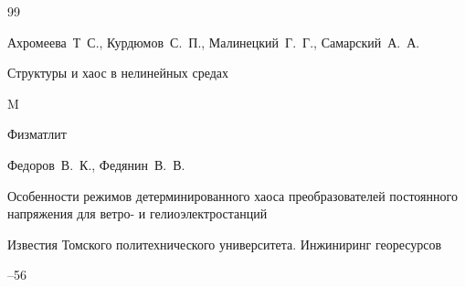 \begin{thebibliography}{99}

	


\by Ахромеева~Т~С., Курдюмов~С.~П., Малинецкий~Г.~Г., Самарский~А.~А.  

\book Структуры и хаос в нелинейных средах

\publaddr M

\publ Физматлит














\by Федоров~В.~К., Федянин~В.~В.

\paper Особенности режимов детерминированного хаоса преобразователей постоянного напряжения для ветро- и гелиоэлектростанций

\jour Известия Томского политехнического университета. Инжиниринг георесурсов




--56














\end{thebibliography}
